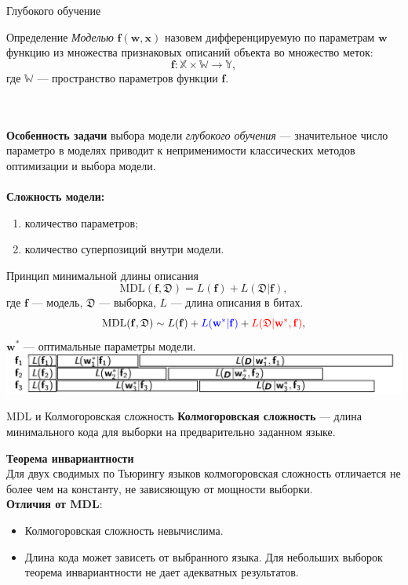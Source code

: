 \documentclass[usenames,dvipsnames,10pt,pdf,utf8,russian,aspectratio=43]{beamer}
\begin{document}
\begin{frame}{Глубокого обучение}
\begin{block}{Определение}
\textit{Моделью} $\mathbf{f}(\mathbf{w}, \mathbf{x})$ назовем дифференцируемую по параметрам $\mathbf{w}$ функцию из множества признаковых описаний объекта во множество меток:
\[
    \mathbf{f}: \mathbb{X} \times \mathbb{W} \to \mathbb{Y},
\] 
где $\mathbb{W}$ --- пространство параметров функции $\mathbf{f}$.
\end{block}
~\\~\\
\textbf{Особенность задачи}  выбора модели \textit{глубокого обучения} --- значительное число параметро в моделях приводит к неприменимости классических методов оптимизации и выбора модели. \\~\\

\textbf{Сложность модели:}
\begin{enumerate}
\item количество параметров;
\item количество суперпозиций внутри модели.
\end{enumerate}
\end{frame}


\begin{frame}{Принцип минимальной длины описания}
\[
\text{MDL}(\mathbf{f}, \mathfrak{D}) = L(\mathbf{f}) + L(\mathfrak{D}|\mathbf{f}),
\]
где $\mathbf{f}$ --- модель, $\mathfrak{D}$ --- выборка, $L$ --- длина описания в битах.
\\
\[
\text{MDL}(\mathbf{f}, \mathfrak{D}) \sim L(\mathbf{f}) + \textcolor{blue}{L(\mathbf{w}^*| \mathbf{f})} + \textcolor{red}{L(\mathfrak{D}|\mathbf{w}^*, \mathbf{f})},
\]
$\mathbf{w}^*$ --- оптимальные параметры модели.\\

\includegraphics[width=\textwidth]{./mdl.png}

\end{frame}

\begin{frame}{MDL и Колмогоровская сложность}
\textbf{Колмогоровская сложность} --- длина минимального кода для выборки на предварительно заданном языке.

\textbf{Теорема инвариантности}\\
Для двух сводимых по Тьюрингу языков колмогоровская сложность  отличается не более чем на константу, не зависяющую от мощности выборки.\\

\textbf{Отличия от MDL}:
\begin{itemize}
\item Колмогоровская сложность невычислима.
\item Длина кода может зависеть от выбранного языка. Для небольших выборок теорема инвариантности не дает адекватных результатов.
\end{itemize}
\end{frame}
\end{document}
